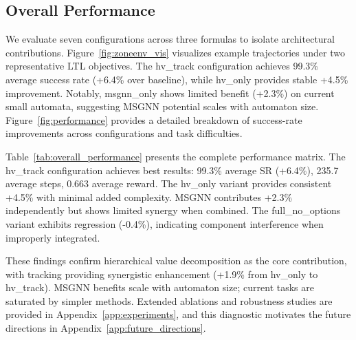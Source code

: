 \documentclass{article}
\begin{document}
\begin{table}[t]
\centering
\caption{HV-Related Configuration Performance}
\label{tab:hv_comparison}
\end{table}

\subsection{Overall Performance}
We evaluate seven configurations across three formulas to isolate architectural contributions. Figure~\ref{fig:zoneenv_vis} visualizes example trajectories under two representative LTL objectives. The hv\_track configuration achieves 99.3\% average success rate (+6.4\% over baseline), while hv\_only provides stable +4.5\% improvement. Notably, msgnn\_only shows limited benefit (+2.3\%) on current small automata, suggesting MSGNN potential scales with automaton size. Figure~\ref{fig:performance} provides a detailed breakdown of success-rate improvements across configurations and task difficulties.






Table~\ref{tab:overall_performance} presents the complete performance matrix. The hv\_track configuration achieves best results: 99.3\% average SR (+6.4\%), 235.7 average steps, 0.663 average reward. The hv\_only variant provides consistent +4.5\% with minimal added complexity. MSGNN contributes +2.3\% independently but shows limited synergy when combined. The full\_no\_options variant exhibits regression (-0.4\%), indicating component interference when improperly integrated.

These findings confirm hierarchical value decomposition as the core contribution, with tracking providing synergistic enhancement (+1.9\% from hv\_only to hv\_track). MSGNN benefits scale with automaton size; current tasks are saturated by simpler methods. Extended ablations and robustness studies are provided in Appendix~\ref{app:experiments}, and this diagnostic motivates the future directions in Appendix~\ref{app:future_directions}.
\end{document}
